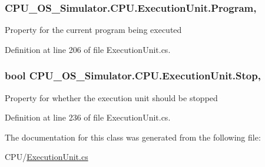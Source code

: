 \subsubsection[{Program}]{ C\+P\+U\+\_\+\+O\+S\+\_\+\+Simulator.\+C\+P\+U.\+Execution\+Unit.\+Program\hspace{0.3cm}{\ttfamily [get]}, {\ttfamily [set]}}\label{class_c_p_u___o_s___simulator_1_1_c_p_u_1_1_execution_unit_a5266ac137491de1efa6c4d707fcd162e}


Property for the current program being executed 



Definition at line 206 of file Execution\+Unit.\+cs.

\hypertarget{class_c_p_u___o_s___simulator_1_1_c_p_u_1_1_execution_unit_a1b8748f1c6679263e5dc03fe382ad150}{}
\subsubsection[{Stop}]{\setlength{\rightskip}{0pt plus 5cm}bool C\+P\+U\+\_\+\+O\+S\+\_\+\+Simulator.\+C\+P\+U.\+Execution\+Unit.\+Stop\hspace{0.3cm}{\ttfamily [get]}, {\ttfamily [set]}}\label{class_c_p_u___o_s___simulator_1_1_c_p_u_1_1_execution_unit_a1b8748f1c6679263e5dc03fe382ad150}


Property for whether the execution unit should be stopped 



Definition at line 236 of file Execution\+Unit.\+cs.



The documentation for this class was generated from the following file\+:\begin{DoxyCompactItemize}
\item 
C\+P\+U/\hyperlink{_execution_unit_8cs}{Execution\+Unit.\+cs}\end{DoxyCompactItemize}
